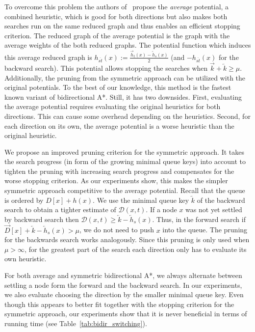 \documentclass[manuscript,review]{acmart}
\newcommand*{\dist}{\mathcal{D}}
\begin{document}
To overcome this problem the authors of~\cite{gh-cspas-05} propose the \emph{average} potential, a combined heuristic, which is good for both directions but also makes both searches run on the same reduced graph and thus enables an efficient stopping criterion.
The reduced graph of the average potential is the graph with the average weights of the both reduced graphs.
The potential function which induces this average reduced graph is $h_{\overline{st}}(x) := \frac{\overrightarrow{h}_t(x) - \overleftarrow{h}_s(x)}{2}$ (and $-h_{\overline{st}}(x)$ for the backward search).
This potential allows stopping the searches when $\overrightarrow{k} + \overleftarrow{k} \geq \mu$.
Additionally, the pruning from the symmetric approach can be utilized with the original potentials.
To the best of our knowledge, this method is the fastest known variant of bidirectional A*.
Still, it has two downsides.
First, evaluating the average potential requires evaluating the original heuristics for both directions.
This can cause some overhead depending on the heuristics.
Second, for each direction on its own, the average potential is a worse heuristic than the original heuristic.

We propose an improved pruning criterion for the symmetric approach.
It takes the search progress (in form of the growing minimal queue keys) into account to tighten the pruning with increasing search progress and compensates for the worse stopping criterion.
As our experiments show, this makes the simpler symmetric approach competitive to the average potential.
Recall that the queue is ordered by $D[x] + h(x)$.
We use the minimal queue key $\overleftarrow{k}$ of the backward search to obtain a tighter estimate of $\dist(x,t)$.
If a node $x$ was not yet settled by backward search then $\dist(x,t) \geq \overleftarrow{k} - \overleftarrow{h}_s(x)$.
Thus, in the forward search if $\overrightarrow{D}[x] + \overleftarrow{k} - \overleftarrow{h}_s(x) > \mu$, we do not need to push $x$ into the queue.
The pruning for the backwards search works analogously.
Since this pruning is only used when $\mu > \infty$, for the greatest part of the search each direction only has to evaluate its own heuristic.

For both average and symmetric bidirectional A*, we always alternate between settling a node form the forward and the backward search.
In our experiments, we also evaluate choosing the direction by the smaller minimal queue key.
Even though this appears to better fit together with the stopping criterion for the symmetric approach, our experiments show that it is never beneficial in terms of running time (see Table~\ref{tab:bidir_switching}).
\end{document}
